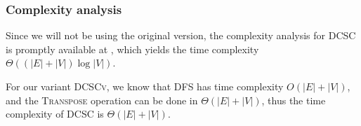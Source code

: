 \subsubsection{Complexity analysis}
Since we will not be using the original version, the complexity analysis for \textsc{DCSC} is promptly available at \cite{fleischer-dcsc}, which yields the time complexity $\Theta((|E|+|V|) \log |V|)$.\par
For our variant \textsc{DCSCv}, we know that \textsc{DFS} has time complexity $O(|E|+|V|)$, and the \textsc{Transpose} operation can be done in $\Theta(|E|+|V|)$, thus the time complexity of \textsc{DCSC} is $\Theta(|E|+|V|)$.
